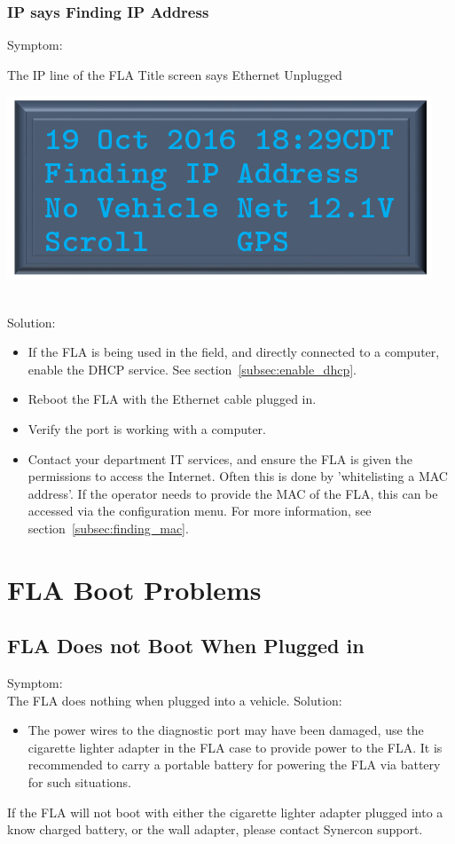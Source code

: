 \documentclass[11pt, oneside]{book}
\begin{document}
\subsubsection{IP says Finding IP Address}
Symptom:\\
\noindent\begin{minipage}{0.45\textwidth}%
The IP line of the FLA Title screen says Ethernet Unplugged
\end{minipage}%
\hfill%
\begin{minipage}{0.45\textwidth}
\includegraphics[width=\linewidth]{../media/pstricks_files/01_main_screen_finding_ip}
\end{minipage}\\
Solution:\\
\begin{itemize}
\item If the FLA is being used in the field, and directly connected to a computer, enable the DHCP service. See section~\ref{subsec:enable_dhcp}.
\item Reboot the FLA with the Ethernet cable plugged in.
\item Verify the port is working with a computer.
\item Contact your department IT services, and ensure the FLA is given the permissions to access the Internet. Often this is done by 'whitelisting a MAC address'. If the operator needs to provide the MAC of the FLA, this can be accessed via the configuration menu. For more information, see section~\ref{subsec:finding_mac}.
\end{itemize}
\section{FLA Boot Problems}
\subsection{FLA Does not Boot When Plugged in}
Symptom:\\
The FLA does nothing when plugged into a vehicle.
Solution:\\
\begin{itemize}
\item The power wires to the diagnostic port may have been damaged, use the cigarette lighter adapter in the FLA case to provide power to the FLA. It is recommended to carry a portable battery for powering the FLA via battery for such situations.
\end{itemize}
If the FLA will not boot with either the cigarette lighter adapter plugged into a know charged battery, or the wall adapter, please contact Synercon support.
\end{document}
